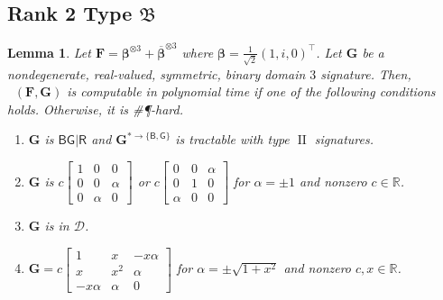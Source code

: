 \documentclass[11pt]{article}
\newtheorem{lemma}[theorem]{Lemma}
\DeclareMathOperator{\holts}{Holant^*_3}
\DeclareMathOperator{\typeii}{II}
\newcommand{\db}{\mathsf{B}}
\newcommand{\dg}{\mathsf{G}}
\newcommand{\dr}{\mathsf{R}}
\newcommand{\sph}{\#\P-hard\xspace}
\newcommand{\teh}{^{\otimes 3}}
\newcommand{\transpose}{^\intercal}
\newcommand{\domres}[1]{
  ^{*\to\{#1\}}
}
\newcommand{\ternarytractz}{$\mathfrak{B}$\xspace}
\begin{document}
\subsection{Rank 2 Type \texorpdfstring{\ternarytractz}{B}}
\begin{lemma}\label{lem:dichotomy-single-ternary-rank-2-z-single-binary}
  Let $\mathbf{F} = \boldsymbol{\beta}\teh + \overline{\boldsymbol{\beta}}\teh$ where $\boldsymbol{\beta} = \frac{1}{\sqrt{2}}(1, i, 0)\transpose$.
  Let $\mathbf{G}$ be a nondegenerate, real-valued, symmetric, binary domain $3$ signature.
  Then, $\holts(\mathbf{F}, \mathbf{G})$ is computable in polynomial time if one of the following conditions holds. Otherwise, it is \sph.
  \begin{enumerate}
    \item $\mathbf{G}$ is $\db \dg | \dr$ and $\mathbf{G}\domres{\db, \dg}$ is tractable with type $\typeii$ signatures.
    \item $\mathbf{G}$ is $c \begin{bmatrix}
        1 & 0 & 0 \\
        0 & 0 & \alpha \\
        0 & \alpha & 0
        \end{bmatrix}$ or $c \begin{bmatrix}
        0 & 0 & \alpha \\
        0 & 1 & 0 \\
        \alpha & 0 & 0
      \end{bmatrix}$ for $\alpha = \pm 1$ and nonzero $c \in \mathbb{R}$.
    \item $\mathbf{G}$ is in $\mathcal{D}$.
    \item $\mathbf{G} = c  \begin{bmatrix}
        1 & x & -x \alpha \\
        x & x^2 & \alpha \\
        -x \alpha & \alpha & 0
      \end{bmatrix}$ for $\alpha = \pm \sqrt{1 + x^2}$ and nonzero $c, x \in \mathbb{R}$.
  \end{enumerate}
\end{lemma}
\end{document}
